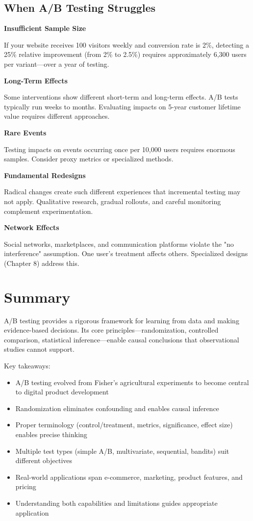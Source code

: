 \subsection{When A/B Testing Struggles}

\textbf{Insufficient Sample Size}

If your website receives 100 visitors weekly and conversion rate is 2\%, detecting a 25\% relative improvement (from 2\% to 2.5\%) requires approximately 6,300 users per variant—over a year of testing.

\textbf{Long-Term Effects}

Some interventions show different short-term and long-term effects. A/B tests typically run weeks to months. Evaluating impacts on 5-year customer lifetime value requires different approaches.

\textbf{Rare Events}

Testing impacts on events occurring once per 10,000 users requires enormous samples. Consider proxy metrics or specialized methods.

\textbf{Fundamental Redesigns}

Radical changes create such different experiences that incremental testing may not apply. Qualitative research, gradual rollouts, and careful monitoring complement experimentation.

\textbf{Network Effects}

Social networks, marketplaces, and communication platforms violate the "no interference" assumption. One user's treatment affects others. Specialized designs (Chapter 8) address this.

\section{Summary}

A/B testing provides a rigorous framework for learning from data and making evidence-based decisions. Its core principles—randomization, controlled comparison, statistical inference—enable causal conclusions that observational studies cannot support.

Key takeaways:
\begin{itemize}
    \item A/B testing evolved from Fisher's agricultural experiments to become central to digital product development
    \item Randomization eliminates confounding and enables causal inference
    \item Proper terminology (control/treatment, metrics, significance, effect size) enables precise thinking
    \item Multiple test types (simple A/B, multivariate, sequential, bandits) suit different objectives
    \item Real-world applications span e-commerce, marketing, product features, and pricing
    \item Understanding both capabilities and limitations guides appropriate application
\end{itemize}

